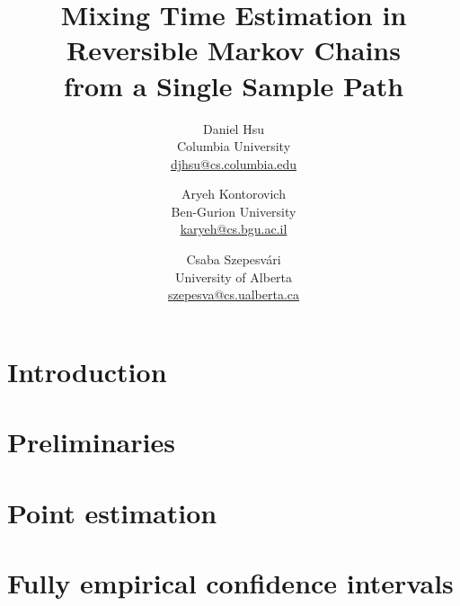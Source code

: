 \documentclass{article}
\title{%
  Mixing Time Estimation in Reversible Markov Chains \\
  from a Single Sample Path%
}
\author{%
  Daniel Hsu \\
  Columbia University \\
  \url{djhsu@cs.columbia.edu}
  \and
  Aryeh Kontorovich \\
  Ben-Gurion University \\
  \url{karyeh@cs.bgu.ac.il}
  \and
  Csaba Szepesv\'ari \\
  University of Alberta \\
  \url{szepesva@cs.ualberta.ca}
}
\begin{document}
\maketitle

\begin{abstract} 

\end{abstract} 

\section{Introduction}\label{sec:intro}


\section{Preliminaries}\label{sec:prelim}


\section{Point estimation}\label{sec:rates}


\section{Fully empirical confidence intervals}\label{sec:empirical}


%




%
%
%
%
%
%
%
%
\end{document}
